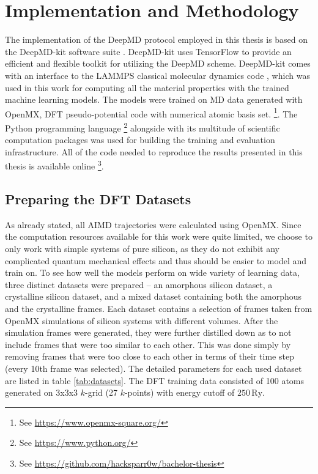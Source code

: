 \chapter{Implementation and Methodology}

The implementation of the DeepMD protocol employed in this thesis is based on
the DeepMD-kit software suite \cite{Wang_DeePMD-kit_A_deep_2018}. DeepMD-kit
uses TensorFlow \cite{tensorflow2015-whitepaper} to provide an efficient and
flexible toolkit for utilizing the DeepMD scheme. DeepMD-kit comes with an
interface to the LAMMPS classical molecular dynamics code \cite{LAMMPS},
which was used in this work for computing all the material properties with the
trained machine learning models. The models were trained on MD data generated
with OpenMX, DFT pseudo-potential code with numerical atomic basis set.
\footnote{
    See \url{https://www.openmx-square.org/}
}. The Python programming language
\footnote{
    See \url{https://www.python.org/}
} alongside with its multitude of scientific computation packages was used for
building the training and evaluation infrastructure. All of the code needed to
reproduce the results presented in this thesis is available online
\footnote{
    See \url{https://github.com/hacksparr0w/bachelor-thesis}
}.

\section{Preparing the DFT Datasets}

As already stated, all AIMD trajectories were calculated using OpenMX. Since
the computation resources available for this work were quite limited, we
choose to only work with simple systems of pure silicon, as they do not
exhibit any complicated quantum mechanical effects and thus should be easier to model and
train on. To see how well the models perform on wide variety of learning data,
three distinct datasets were prepared -- an amorphous silicon dataset, a
crystalline silicon dataset, and a mixed dataset containing both the amorphous
and the crystalline frames. Each dataset contains a selection of frames taken
from OpenMX simulations of silicon systems with different volumes. After the
simulation frames were generated, they were further distilled down as to not
include frames that were too similar to each other. This was done simply by
removing frames that were too close to each other in terms of their time step
(every 10th frame was selected). The detailed parameters for each used dataset
are listed in table \ref{tab:datasets}. The DFT training data consisted of
100 atoms generated on 3x3x3 $k$-grid (27 $k$-points) with energy cutoff of
$250 \, \mathrm{Ry}$.

